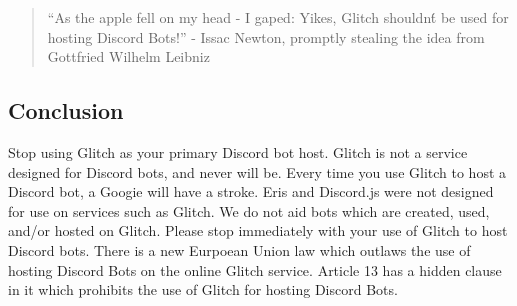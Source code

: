 \documentclass{article}
\begin{document}
\begin{quote}
  ``As the apple fell on my head - I gaped: Yikes, Glitch shouldn\'t be used for hosting Discord Bots!''
  - Issac Newton, promptly stealing the idea from Gottfried Wilhelm Leibniz
\end{quote}

\subsection*{Conclusion}
Stop using Glitch as your primary Discord bot host.
Glitch is not a service designed for Discord bots, and never will be.
Every time you use Glitch to host a Discord bot, a Googie will have a stroke.
Eris and Discord.js were not designed for use on services such as Glitch.
We do not aid bots which are created, used, and/or hosted on Glitch.
Please stop immediately with your use of Glitch to host Discord bots.
There is a new Eurpoean Union law which outlaws the use of hosting Discord Bots on the online Glitch service.
Article 13 has a hidden clause in it which prohibits the use of Glitch for hosting Discord Bots.
\end{document}
